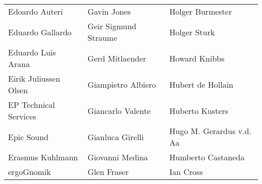 \begin{tabular}{p{4.5cm}p{4.5cm}p{4.5cm}}
Edoardo Auteri & Gavin Jones & Holger Burmester \\
Eduardo Gallardo & Geir Sigmund Straume & Holger Sturk \\
Eduardo Luis Arana & Gerd Mitlaender & Howard Knibbs \\
Eirik Juliussen Olsen & Giampietro Albiero & Hubert de Hollain \\
EP Technical Services & Giancarlo Valente & Huberto Kusters \\
Epic Sound & Gianluca Girelli & Hugo M. Gerardus v.d. Aa \\
Erasmus Kuhlmann & Giovanni Medina & Humberto Castaneda \\
ergoGnomik & Glen Fraser & Ian Cross \\
\end{tabular}
\newpage
\setlength{\tabcolsep}{1mm}
